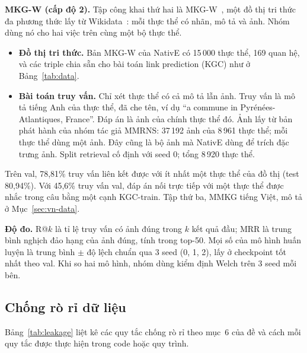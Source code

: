 \textbf{MKG-W (cấp độ 2).} Tập công khai thứ hai là MKG-W~\cite{xu2022mmrns}, một đồ thị tri thức đa phương thức lấy từ
Wikidata~\cite{vrandecic2014wikidata}: mỗi thực thể có nhãn, mô tả và ảnh. Nhóm dùng nó cho hai việc trên cùng một bộ thực thể.
\begin{itemize}
\item \textbf{Đồ thị tri thức.} Bản MKG-W của NativE có 15\,000 thực thể, 169 quan hệ, và các triple chia sẵn cho bài toán
link prediction (KGC) như ở Bảng~\ref{tab:data}.
\item \textbf{Bài toán truy vấn.} Chỉ xét thực thể có cả mô tả lẫn ảnh. Truy vấn là mô tả tiếng Anh của thực thể, đã che
tên, ví dụ ``a commune in Pyrénées-Atlantiques, France''. Đáp án là ảnh của chính thực thể đó. Ảnh lấy từ bản phát hành của
nhóm tác giả MMRNS: 37\,192 ảnh của 8\,961 thực thể; mỗi thực thể dùng một ảnh. Đây cũng là bộ ảnh mà NativE dùng để trích
đặc trưng ảnh. Split retrieval cố định với seed 0; tổng 8\,920 thực thể.
\end{itemize}
Trên val, 78,81\% truy vấn liên kết được với ít nhất một thực thể của đồ thị (test 80,94\%). Với 45,6\% truy vấn val, đáp án
nối trực tiếp với một thực thể được nhắc trong câu bằng một cạnh KGC-train. Tập thứ ba, MMKG tiếng Việt, mô tả ở
Mục~\ref{sec:vn-data}.

\textbf{Độ đo.} R@$k$ là tỉ lệ truy vấn có ảnh đúng trong $k$ kết quả đầu; MRR là trung bình nghịch đảo hạng của ảnh đúng,
tính trong top-50. Mọi số của mô hình huấn luyện là trung bình $\pm$ độ lệch chuẩn qua 3 seed (0, 1, 2), lấy ở checkpoint
tốt nhất theo val. Khi so hai mô hình, nhóm dùng kiểm định Welch trên 3 seed mỗi bên.

\subsection{Chống rò rỉ dữ liệu}
\label{sec:leakage}

Bảng~\ref{tab:leakage} liệt kê các quy tắc chống rò rỉ theo mục~6 của đề và cách mỗi quy tắc được thực hiện trong code
hoặc quy trình.

